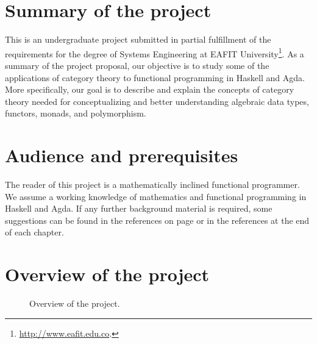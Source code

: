 \section*{Summary of the project}
\label{sec:introduction-summary}

This is an undergraduate project submitted in partial fulfillment of
the requirements for the degree of Systems Engineering at EAFIT
University\footnote{\url{http://www.eafit.edu.co}.}. As a summary of
the project proposal, our objective is to study some of the
applications of category theory to functional programming in Haskell
and Agda. More specifically, our goal is to describe and explain the
concepts of category theory needed for conceptualizing and better
understanding algebraic data types, functors, monads, and
polymorphism.

\section*{Audience and prerequisites}
\label{sec:introduction-prerequisites}

The reader of this project is a mathematically inclined functional
programmer. We assume a working knowledge of mathematics and
functional programming in Haskell and Agda. If any further background
material is required, some suggestions can be found in the references
on page \pageref{sec:introduction-references} or in the references at
the end of each chapter.

\section*{Overview of the project}
\label{sec:introduction-overview}

\begin{figure}[htb]
  \begin{center}
  \end{center}
  \caption{Overview of the project.}
  \label{fig:overview}
\end{figure}

